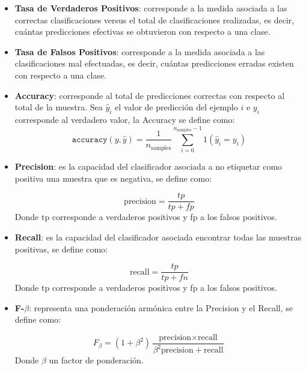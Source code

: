 \begin{itemize}
	
	\item \textbf{Tasa de Verdaderos Positivos}: corresponde a la medida asociada a las correctas clasificaciones versus el total de clasificaciones realizadas, es decir, cuántas predicciones efectivas se obtuvieron con respecto a una clase.
	
	\item \textbf{Tasa de Falsos Positivos}: corresponde a la medida asociada a las clasificaciones mal efectuadas, es decir, cuántas predicciones erradas existen con respecto a una clase.
	
	
	\item \textbf{Accuracy}: corresponde al total de predicciones correctas con respecto al total de la muestra. Sea $\hat{y}_i$ el valor de predicción del ejemplo $i$ e $y_{i}$ corresponde al verdadero valor, la Accuracy se define como: 
	\begin{equation}
		\texttt{accuracy}(y, \hat{y}) = \frac{1}{n_\text{samples}} \sum_{i=0}^{n_\text{samples}-1} 1(\hat{y}_i = y_i)
	\end{equation}
	
	
	\item \textbf{Precision}: es la capacidad del clasificador asociada a no etiquetar como positiva una muestra que es negativa, se define como: 
	
	\begin{equation}
		\text{precision} = \frac{tp}{tp + fp}
	\end{equation}
	Donde tp corresponde a verdaderos positivos y fp a los falsos positivos.
	
	
	\item \textbf{Recall}: es la capacidad del clasificador asociada encontrar todas las muestras positivas, se define como: 
	
	\begin{equation}
		\text{recall} = \frac{tp}{tp + fn}
	\end{equation}
	Donde tp corresponde a verdaderos positivos y fp a los falsos positivos.
	
	\item \textbf{F-$\beta$}: representa una ponderación armónica entre la Precision y el Recall, se define como: 
	
	\begin{equation}
		F_\beta = (1 + \beta^2) \frac{\text{precision} \times \text{recall}}{\beta^2 \text{precision} + \text{recall}}
	\end{equation}
	Donde $\beta$ un factor de ponderación.
	

\end{itemize}
